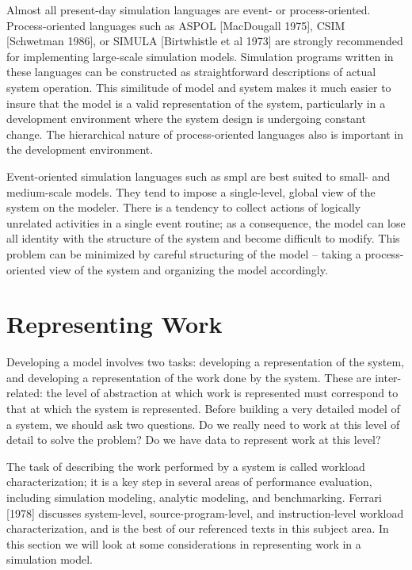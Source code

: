 Almost all present-day simulation languages are event- or process-oriented.
Process-oriented languages such as ASPOL [MacDougall 1975], CSIM [Schwetman
1986], or SIMULA [Birtwhistle et al 1973] are strongly recommended for
implementing large-scale simulation models. Simulation programs written in
these languages can be constructed as straightforward descriptions of actual
system operation. This similitude of model and system makes it much easier to
insure that the model is a valid representation of the system, particularly in
a development environment where the system design is undergoing constant
change. The hierarchical nature of process-oriented languages also is
important in the development environment.

Event-oriented simulation languages such as smpl are best suited to small- and
medium-scale models. They tend to impose a single-level, global view of the
system on the modeler. There is a tendency to collect actions of logically
unrelated activities in a single event routine; as a consequence, the model can
lose all identity with the structure of the system and become difficult to
modify. This problem can be minimized by careful structuring of the model --
taking a process-oriented view of the system and organizing the model
accordingly.

\section{Representing Work}
\label{sec:representing-work}

Developing a model involves two tasks: developing a representation of the
system, and developing a representation of the work done by the system. These
are inter-related: the level of abstraction at which work is represented must
correspond to that at which the system is represented. Before building a very
detailed model of a system, we should ask two questions. Do we really need to
work at this level of detail to solve the problem? Do we have data to represent
work at this level?

The task of describing the work performed by a system is called workload
characterization; it is a key step in several areas of performance evaluation,
including simulation modeling, analytic modeling, and benchmarking. Ferrari
[1978] discusses system-level, source-program-level, and instruction-level
workload characterization, and is the best of our referenced texts in this
subject area. In this section we will look at some considerations in
representing work in a simulation model.

